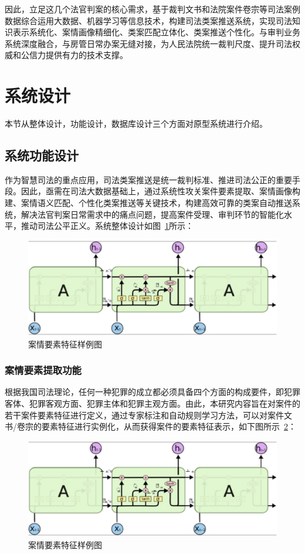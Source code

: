 因此，立足这几个法官判案的核心需求，基于裁判文书和法院案件卷宗等司法案例数据综合运用大数据、机器学习等信息技术，构建司法类案推送系统，实现司法知识表示系统化、案情画像精细化、类案匹配立体化、类案推送个性化。与审判业务系统深度融合，与房管日常办案无缝对接，为人民法院统一裁判尺度、提升司法权威和公信力提供有力的技术支撑。

\section{系统设计}
本节从整体设计，功能设计，数据库设计三个方面对原型系统进行介绍。
\subsection{系统功能设计}
作为智慧司法的重点应用，司法类案推送是统一裁判标准、推进司法公正的重要手段。因此，亟需在司法大数据基础上，通过系统性攻关案件要素提取、案情画像构建、案情语义匹配、个性化类案推送等关键技术，构建高效可靠的类案自动推送系统，解决法官判案日常需求中的痛点问题，提高案件受理、审判环节的智能化水平，推动司法公平正义。系统整体设计如图~\ref{fig:sys_main}所示：
\begin{figure}[htbp]%
    \centering
    \includegraphics[scale=0.30, clip=true]{./sources/lstm.eps}
    \caption{\label{fig:sys_main}案情要素特征样例图}
\end{figure}



\subsubsection{案情要素提取功能}
根据我国司法理论，任何一种犯罪的成立都必须具备四个方面的构成要件，即犯罪客体、犯罪客观方面、犯罪主体和犯罪主观方面。由此，本研究内容旨在对案件的若干案件要素特征进行定义，通过专家标注和自动规则学习方法，可以对案件文书/卷宗的要素特征进行实例化，从而获得案件的要素特征表示，如下图所示~\ref{fig:sys_element_demo}：

\begin{figure}[htbp]%
    \centering
    \includegraphics[scale=0.30, clip=true]{./sources/lstm.eps}
    \caption{\label{fig:sys_element_demo}案情要素特征样例图}
\end{figure}

